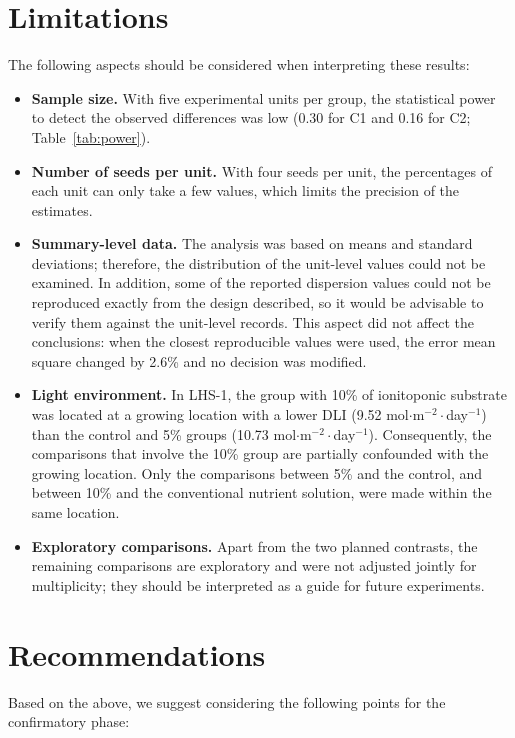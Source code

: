 \documentclass[11pt]{article}
\begin{document}
\section{Limitations}

The following aspects should be considered when interpreting these results:

\begin{itemize}[leftmargin=1.4em,itemsep=2pt]
\item \textbf{Sample size.} With five experimental units per group, the statistical power to detect the observed differences was low (0.30 for C1 and 0.16 for C2; Table~\ref{tab:power}).
\item \textbf{Number of seeds per unit.} With four seeds per unit, the percentages of each unit can only take a few values, which limits the precision of the estimates.
\item \textbf{Summary-level data.} The analysis was based on means and standard deviations; therefore, the distribution of the unit-level values could not be examined. In addition, some of the reported dispersion values could not be reproduced exactly from the design described, so it would be advisable to verify them against the unit-level records. This aspect did not affect the conclusions: when the closest reproducible values were used, the error mean square changed by 2.6\% and no decision was modified.
\item \textbf{Light environment.} In LHS-1, the group with 10\% of ionitoponic substrate was located at a growing location with a lower DLI (9.52 mol$\cdot$m$^{-2}\cdot$day$^{-1}$) than the control and 5\% groups (10.73 mol$\cdot$m$^{-2}\cdot$day$^{-1}$). Consequently, the comparisons that involve the 10\% group are partially confounded with the growing location. Only the comparisons between 5\% and the control, and between 10\% and the conventional nutrient solution, were made within the same location.
\item \textbf{Exploratory comparisons.} Apart from the two planned contrasts, the remaining comparisons are exploratory and were not adjusted jointly for multiplicity; they should be interpreted as a guide for future experiments.
\end{itemize}

\section{Recommendations}

Based on the above, we suggest considering the following points for the confirmatory phase:
\end{document}
